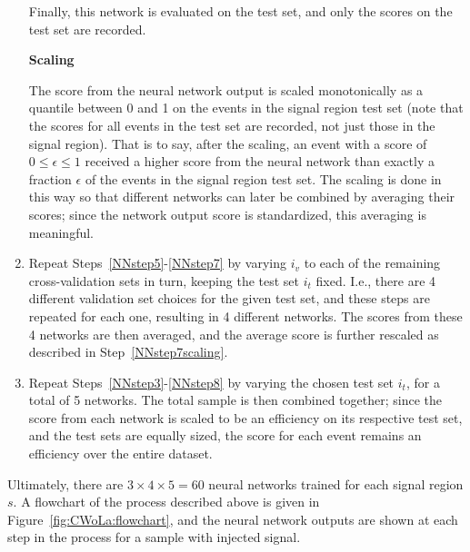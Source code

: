 \begin{enumerate}
  Finally, this network is evaluated on the test set, and only the scores on the test set are recorded.

  \textbf{Scaling}
  \label{NNstep7scaling}

  The score from the neural network output is scaled monotonically as a quantile between 0 and 1 on the events in the signal region test set (note that the scores for all events in the test set are recorded, not just those in the signal region).
  That is to say, after the scaling, an event with a score of $0 \le \epsilon \le 1$ received a higher score from the neural network than exactly a fraction $\epsilon$ of the events in the signal region test set.
  The scaling is done in this way so that different networks can later be combined by averaging their scores; since the network output score is standardized, this averaging is meaningful.
  \item Repeat Steps~\ref{NNstep5}-\ref{NNstep7} by varying $i_v$ to each of the remaining cross-validation sets in turn, keeping the test set $i_t$ fixed.
    I.e., there are 4 different validation set choices for the given test set, and these steps are repeated for each one, resulting in 4 different networks.
    The scores from these 4 networks are then averaged, and the average score is further rescaled as described in Step~\ref{NNstep7scaling}.
  \label{NNstep8}
  \item Repeat Steps~\ref{NNstep3}-\ref{NNstep8} by varying the chosen test set $i_t$, for a total of 5 networks.
  The total sample is then combined together; since the score from each network is scaled to be an efficiency on its respective test set, and the test sets are equally sized, the score for each event remains an efficiency over the entire dataset.
  \label{NNstep9}
\end{enumerate}

Ultimately, there are $3\times4\times5 = 60$ neural networks trained for each signal region $s$. A flowchart of the process described above is given in Figure~\ref{fig:CWoLa:flowchart}, and the neural network outputs are shown at each step in the process for a sample with injected signal.

